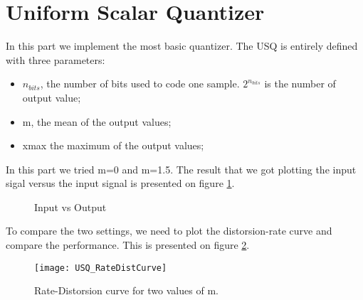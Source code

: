 \section{Uniform Scalar Quantizer}
In this part we implement the most basic quantizer. The USQ is entirely defined with three parameters:\begin{itemize}
\item $n_{bits}$, the number of bits used to code one sample. $2^{n_{bits}}$ is the number of output value;
\item m, the mean of the output values;
\item xmax the maximum of the output values;
\end{itemize}

In this part we tried m=0 and m=1.5. The result that we got plotting the input sigal versus the input signal is presented on figure \ref{USQ_INOUT}.

\begin{figure}[!h]
  \centering
{}

  \caption{Input vs Output}
  \label{USQ_INOUT}
\end{figure}
To compare the two settings, we need to plot the distorsion-rate curve and compare the performance. This is presented on figure \ref{USQ_RateDistCurve}.

\begin{figure}[!h]
  \centering
  \texttt{[image: USQ\_RateDistCurve]}
  \caption{Rate-Distorsion curve for two values of m.}
  \label{USQ_RateDistCurve}
\end{figure}

